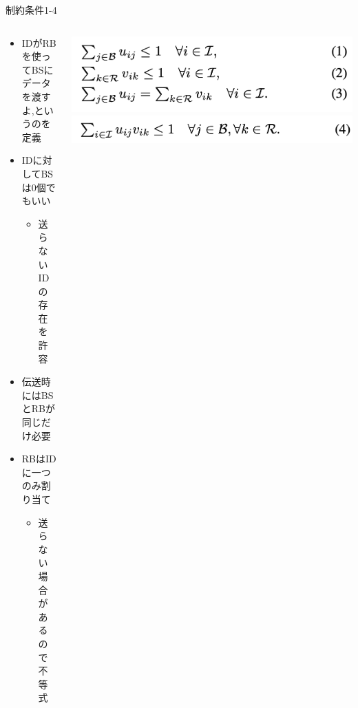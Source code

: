 \documentclass[unicode,12pt,aspectratio=169, dvipdfmx]{beamer}
\begin{document}
    \begin{frame}{制約条件1-4}
        \begin{columns}
            \begin{column}[T]{.6\linewidth}
                \begin{itemize}
                    \item IDがRBを使ってBSにデータを渡すよ,というのを定義
                    \item IDに対してBSは0個でもいい
                    \begin{itemize}
                        \item 送らないIDの存在を許容
                    \end{itemize}    
                    \item 伝送時にはBSとRBが同じだけ必要
                    \item RBはIDに一つのみ割り当て
                    \begin{itemize}
                        \item 送らない場合があるので不等式
                    \end{itemize}    
                \end{itemize}          
            \end{column}
            \begin{column}[T]{.5\linewidth}
                \begin{center}
                    \includegraphics[scale=0.4]{figures/eq1-3.png}
                    \includegraphics[scale=0.4]{figures/eq4.png}
                \end{center}
        \end{column}
        \end{columns}
    \end{frame}
\end{document}
